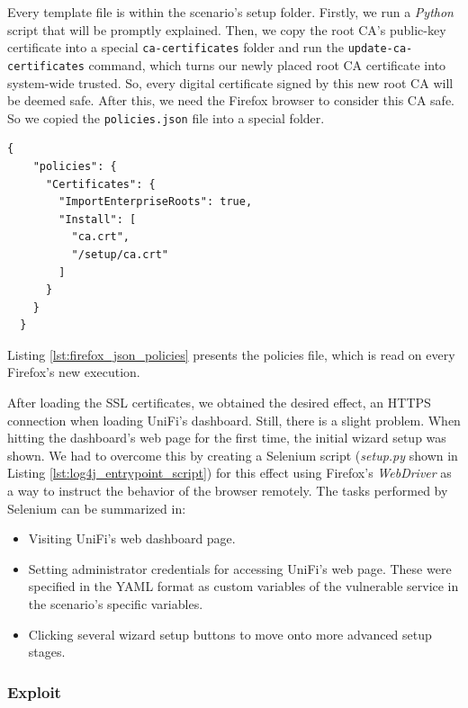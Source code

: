 Every template file is within the scenario's setup folder. Firstly, we run a \textit{Python} script that will be promptly explained. Then, we copy the root CA's public-key certificate into a special \texttt{ca-certificates} folder and run the \texttt{update-ca-certificates} command, which turns our newly placed root CA certificate into system-wide trusted. So, every digital certificate signed by this new root CA will be deemed safe. After this, we need the Firefox browser to consider this CA safe. So we copied the \texttt{policies.json} file into a special folder.

\begin{lstlisting}[caption=Firefox's Policies File.,numbers=none,label={lst:firefox_json_policies}]
{
    "policies": {
      "Certificates": {
        "ImportEnterpriseRoots": true,
        "Install": [
          "ca.crt",
          "/setup/ca.crt"
        ]
      }
    }
  }
\end{lstlisting}

Listing \ref{lst:firefox_json_policies} presents the policies file, which is read on every Firefox's new execution.


After loading the SSL certificates, we obtained the desired effect, an HTTPS connection when loading UniFi's dashboard. Still, there is a slight problem. When hitting the dashboard's web page for the first time, the initial wizard setup was shown. We had to overcome this by creating a Selenium script (\textit{setup.py} shown in Listing \ref{lst:log4j_entrypoint_script}) for this effect using Firefox's \textit{WebDriver} as a way to instruct the behavior of the browser remotely. The tasks performed by Selenium can be summarized in:

\begin{itemize}
    \item Visiting UniFi's web dashboard page.
    \item Setting administrator credentials for accessing UniFi's web page. These were specified in the YAML format as custom variables of the vulnerable service in the scenario's specific variables.
    \item Clicking several wizard setup buttons to move onto more advanced setup stages.
\end{itemize}

\subsubsection{Exploit} \label{sec:validation_log4j_exploit}

